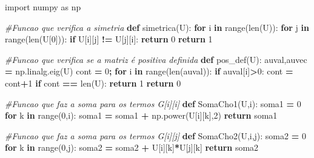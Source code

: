 \documentclass[
]{book}
\newenvironment{Shaded}{\begin{snugshade}}{\end{snugshade}}
\newcommand{\BuiltInTok}[1]{#1}
\newcommand{\CommentTok}[1]{\textcolor[rgb]{0.56,0.35,0.01}{\textit{#1}}}
\newcommand{\ControlFlowTok}[1]{\textcolor[rgb]{0.13,0.29,0.53}{\textbf{#1}}}
\newcommand{\DecValTok}[1]{\textcolor[rgb]{0.00,0.00,0.81}{#1}}
\newcommand{\ImportTok}[1]{#1}
\newcommand{\KeywordTok}[1]{\textcolor[rgb]{0.13,0.29,0.53}{\textbf{#1}}}
\newcommand{\NormalTok}[1]{#1}
\newcommand{\OperatorTok}[1]{\textcolor[rgb]{0.81,0.36,0.00}{\textbf{#1}}}
\begin{document}
\begin{Shaded}
\begin{Highlighting}[]
\ImportTok{import}\NormalTok{ numpy }\ImportTok{as}\NormalTok{ np}

\CommentTok{\#Funcao que verifica a simetria}
\KeywordTok{def}\NormalTok{ simetrica(U):}
  \ControlFlowTok{for}\NormalTok{ i }\KeywordTok{in} \BuiltInTok{range}\NormalTok{(}\BuiltInTok{len}\NormalTok{(U)):}
    \ControlFlowTok{for}\NormalTok{ j  }\KeywordTok{in} \BuiltInTok{range}\NormalTok{(}\BuiltInTok{len}\NormalTok{(U[}\DecValTok{0}\NormalTok{])):}
      \ControlFlowTok{if}\NormalTok{ U[i][j] }\OperatorTok{!=}\NormalTok{ U[j][i]:}
        \ControlFlowTok{return} \DecValTok{0}
  \ControlFlowTok{return} \DecValTok{1}

\CommentTok{\#Funcao que verifica se a matriz é positiva definida}
\KeywordTok{def}\NormalTok{ pos\_def(U):}
\NormalTok{  auval,auvec }\OperatorTok{=}\NormalTok{ np.linalg.eig(U)}
\NormalTok{  cont }\OperatorTok{=} \DecValTok{0}\OperatorTok{;}
  \ControlFlowTok{for}\NormalTok{ i }\KeywordTok{in} \BuiltInTok{range}\NormalTok{(}\BuiltInTok{len}\NormalTok{(auval)):}
    \ControlFlowTok{if}\NormalTok{ auval[i]}\OperatorTok{\textgreater{}}\DecValTok{0}\NormalTok{:}
\NormalTok{      cont }\OperatorTok{=}\NormalTok{ cont}\OperatorTok{+}\DecValTok{1}
  \ControlFlowTok{if}\NormalTok{ cont }\OperatorTok{==} \BuiltInTok{len}\NormalTok{(U):}
    \ControlFlowTok{return} \DecValTok{1}
  \ControlFlowTok{return} \DecValTok{0}

\CommentTok{\#Funcao que faz a soma para os termos G[i][i]}
\KeywordTok{def}\NormalTok{ SomaCho1(U,i):}
\NormalTok{  soma1 }\OperatorTok{=} \DecValTok{0}
  \ControlFlowTok{for}\NormalTok{ k }\KeywordTok{in} \BuiltInTok{range}\NormalTok{(}\DecValTok{0}\NormalTok{,i):}
\NormalTok{    soma1 }\OperatorTok{=}\NormalTok{ soma1 }\OperatorTok{+}\NormalTok{ np.power(U[i][k],}\DecValTok{2}\NormalTok{)}
  \ControlFlowTok{return}\NormalTok{ soma1}

\CommentTok{\#Funcao que faz a soma para os termos G[i][j]}
\KeywordTok{def}\NormalTok{ SomaCho2(U,i,j):}
\NormalTok{  soma2 }\OperatorTok{=} \DecValTok{0}
  \ControlFlowTok{for}\NormalTok{ k }\KeywordTok{in} \BuiltInTok{range}\NormalTok{(}\DecValTok{0}\NormalTok{,j):}
\NormalTok{    soma2 }\OperatorTok{=}\NormalTok{ soma2 }\OperatorTok{+}\NormalTok{ U[i][k]}\OperatorTok{*}\NormalTok{U[j][k]}
  \ControlFlowTok{return}\NormalTok{ soma2}


\end{Highlighting}
\end{Shaded}
\end{document}
